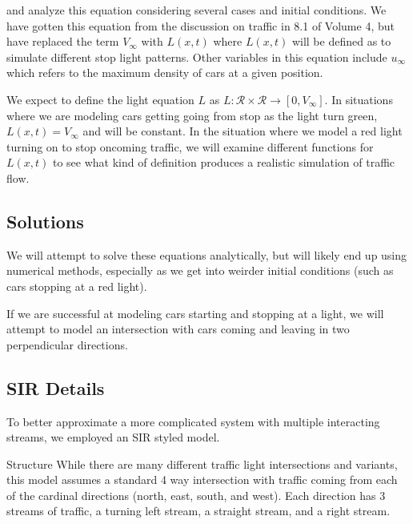 \documentclass[12pt]{article}
\begin{document}
and analyze this equation considering several cases and initial conditions. We have gotten this equation from the discussion on traffic in 8.1 of Volume 4, but have replaced the term $V_\infty$ with $L(x, t)$ where $L(x, t)$ will be defined as to simulate different stop light patterns. Other variables in this equation include $u_\infty$ which refers to the maximum density of cars at a given position. 

We expect to define the light equation $L$ as $L : \mathcal{R} \times \mathcal{R} \to [0, V_\infty]$. In situations where we are modeling cars getting going from stop as the light turn green, $L(x, t) = V_\infty$ and will be constant. In the situation where we model a red light turning on to stop oncoming traffic, we will examine different functions for $L(x, t)$ to see what kind of definition produces a realistic simulation of traffic flow. 

\subsection{Solutions}

We will attempt to solve these equations analytically, but will likely end up using numerical methods, especially as we get into weirder initial conditions (such as cars stopping at a red light). 

If we are successful at modeling cars starting and stopping at a light, we will attempt to model an intersection with cars coming and leaving in two perpendicular directions.


\subsection{SIR Details}
To better approximate a more complicated system with multiple interacting streams, we employed an SIR styled model. 

Structure
While there are many different traffic light intersections and variants, this model assumes a standard 4 way intersection with traffic coming from each of the cardinal directions (north, east, south, and west). Each direction has 3 streams of traffic, a turning left stream, a straight stream, and a right stream. 
\end{document}
